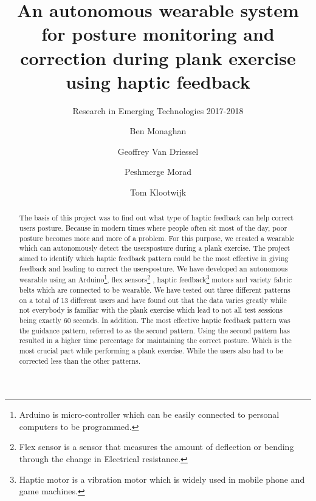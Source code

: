 \documentclass[sigconf]{acmart}
\begin{document}
\title{An autonomous wearable system for posture monitoring and correction during plank exercise using haptic feedback}
\subtitle{Research in Emerging Technologies 2017-2018 }


\author{Ben Monaghan}


\author{Geoffrey Van Driessel}

\author{Peshmerge Morad}

\author{Tom Klootwijk}

\begin{abstract}
The basis of this project was to find out what type of haptic feedback can help correct users posture. Because in modern times where people often sit most of the day, poor posture becomes more and more of a problem. For this purpose, we created a wearable which can autonomously detect the users\textquotesingle posture during a plank exercise. The project aimed to identify which haptic feedback pattern could be the most effective in giving feedback and leading to correct the users\textquotesingle  posture. We have developed an autonomous wearable using an Arduino\footnote{Arduino is micro-controller which can be easily connected to personal computers to be programmed.}, flex sensors\footnote{Flex sensor is a sensor that measures the amount of deflection or bending through the change in Electrical resistance.} , haptic feedback\footnote{Haptic motor is a vibration motor which is widely used in mobile phone and game machines.} motors  and variety fabric belts which are connected to be wearable. We have tested out three different patterns on a total of 13 different users and have found out that the data varies greatly while not everybody is familiar with the plank exercise which lead to not all test sessions being exactly 60 seconds. In addition. The most effective haptic feedback pattern was the guidance pattern, referred to as the second pattern. Using the second pattern has resulted in a higher time percentage for maintaining the correct posture. Which is the most crucial part while performing a plank exercise. While the users also had to be corrected less than the other patterns.
\end{abstract}
\end{document}
